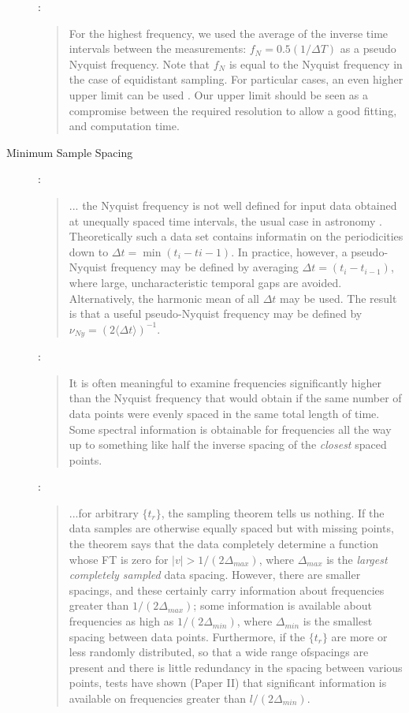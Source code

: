 \documentclass[preprint]{aastex}
\begin{document}
\begin{description}
\citet{Debosscher07}:
\begin{quote}
For the highest frequency, we used the average of the inverse time intervals
between the measurements: $f_N = 0.5(1/\Delta T)$ as a pseudo
Nyquist frequency. Note that $f_N$ is equal to the Nyquist frequency
in the case of equidistant sampling. For particular cases,
an even higher upper limit can be used \citep[see][]{Eyer99}.
Our upper limit should be seen as a compromise between
the required resolution to allow a good fitting, and computation
time.
\end{quote}


\item[Minimum Sample Spacing]

\citet{Percy86}:
\begin{quote}
... the Nyquist frequency is not well defined for input data obtained at unequally spaced time intervals, the usual case in astronomy \citep{Scargle82}.
Theoretically such a data set contains informatin on the periodicities down to
$\Delta t = \min(t_i - t{i-1})$. In practice, however, a pseudo-Nyquist frequency may be defined by averaging $\Delta t = (t_i - t_{i-1})$, where large, uncharacteristic temporal gaps are avoided. Alternatively, the harmonic mean of all $\Delta t$ may be used. The result is that a useful pseudo-Nyquist frequency may be defined by $\nu_{Ny} = (2 \langle\Delta t \rangle)^{-1}$.
\end{quote}

\citet{Press89}:
\begin{quote}
It is often meaningful to examine frequencies significantly higher than the
Nyquist frequency that would obtain if the same number of data points were
evenly spaced in the same total length of time. Some spectral information is
obtainable for frequencies all the way up to something like half the inverse
spacing of the {\it closest} spaced points.
\end{quote}

\citet{Roberts87}:
\begin{quote}
...for arbitrary $\{t_r\}$, the sampling theorem tells us nothing.
If the data samples are otherwise equally spaced but with missing
points, the theorem says that the data completely determine
a function whose FT is zero for $|v| > 1/(2\Delta_{max})$, where $\Delta_{max}$
is the {\it largest completely sampled} data spacing. However,
there are smaller spacings, and these certainly carry information
about frequencies greater than $1/(2\Delta_{max} )$; some information
is available about frequencies as high as
$1/(2\Delta_{min} )$, where $\Delta_{min}$ is the smallest spacing between data
points. Furthermore, if the $\{t_r\}$ are more or less randomly
distributed, so that a wide range ofspacings are present and
there is little redundancy in the spacing between various
points, tests have shown (Paper II) that significant information
is available on frequencies greater than $l/(2\Delta_{min})$.


\end{quote}
\end{description}
\end{document}
